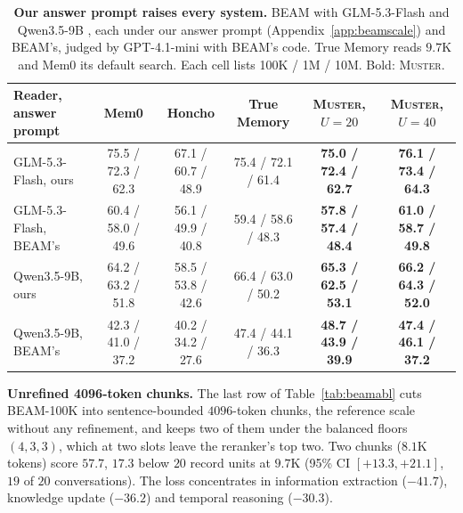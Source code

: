 \documentclass{article}
\newcommand{\tabfont}{\fontsize{7.5}{8.5}\selectfont\renewcommand{\arraystretch}{1.0}}
\newcommand{\sys}{\textsc{Muster}}
\begin{document}
\begin{table}[H]
\centering\tabfont
\caption{\textbf{Our answer prompt raises every system.} BEAM \cite{beam} with GLM-5.3-Flash \cite{glm5} and Qwen3.5-9B \cite{qwen35}, each under our answer prompt (Appendix~\ref{app:beamscale}) and BEAM's, judged by GPT-4.1-mini with BEAM's code. True Memory reads $9.7$K and Mem0 its default search. Each cell lists 100K / 1M / 10M. Bold: \sys{}.}
\label{tab:readers}
\setlength{\tabcolsep}{3pt}\setlength{\aboverulesep}{0pt}\setlength{\belowrulesep}{0pt}\setlength{\extrarowheight}{0.8pt}
\begin{tabular}{lccc>{\columncolor{oursbg}}c>{\columncolor{oursbg}}c}
\toprule
Reader, answer prompt & Mem0 & Honcho & True Memory & \textbf{\sys{}, $U{=}20$} & \textbf{\sys{}, $U{=}40$} \\
\midrule
GLM-5.3-Flash, ours & 75.5 / 72.3 / 62.3 & 67.1 / 60.7 / 48.9 & 75.4 / 72.1 / 61.4 & \textbf{75.0 / 72.4 / 62.7} & \textbf{76.1 / 73.4 / 64.3} \\
GLM-5.3-Flash, BEAM's & 60.4 / 58.0 / 49.6 & 56.1 / 49.9 / 40.8 & 59.4 / 58.6 / 48.3 & \textbf{57.8 / 57.4 / 48.4} & \textbf{61.0 / 58.7 / 49.8} \\
Qwen3.5-9B, ours & 64.2 / 63.2 / 51.8 & 58.5 / 53.8 / 42.6 & 66.4 / 63.0 / 50.2 & \textbf{65.3 / 62.5 / 53.1} & \textbf{66.2 / 64.3 / 52.0} \\
Qwen3.5-9B, BEAM's & 42.3 / 41.0 / 37.2 & 40.2 / 34.2 / 27.6 & 47.4 / 44.1 / 36.3 & \textbf{48.7 / 43.9 / 39.9} & \textbf{47.4 / 46.1 / 37.2} \\
\bottomrule
\end{tabular}
\end{table}

\textbf{Unrefined 4096-token chunks.} The last row of Table~\ref{tab:beamabl} cuts BEAM-100K into sentence-bounded
$4096$-token chunks, the reference scale without any refinement, and keeps two of them under the balanced floors $(4,3,3)$, which at two slots leave the reranker's top two. Two chunks ($8.1$K
tokens) score $57.7$, $17.3$ below $20$ record units at $9.7$K (95\% CI $[+13.3, +21.1]$, $19$ of $20$ conversations). The
loss concentrates in information extraction ($-41.7$), knowledge update ($-36.2$) and temporal reasoning ($-30.3$).
\end{document}
